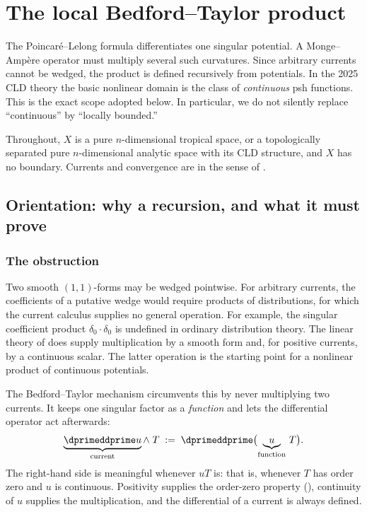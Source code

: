 \chapter{The local Bedford--Taylor product}
\label{chap:cld-bedford-taylor}

The Poincar\'e--Lelong formula differentiates one singular potential.  A
Monge--Amp\`ere operator must multiply several such curvatures.  Since
arbitrary currents cannot be wedged, the product is defined recursively from
potentials.  In the 2025 CLD theory the basic nonlinear domain is the class
of \emph{continuous} psh functions.  This is the exact scope adopted below.
In particular, we do not silently replace ``continuous'' by ``locally
bounded.''

Throughout, $X$ is a pure $n$-dimensional tropical space, or a
topologically separated pure $n$-dimensional analytic space with its CLD
structure, and $X$ has no boundary.  Currents and convergence are in the
sense of .

\section{Orientation: why a recursion, and what it must prove}
\label{sec:ch16-orientation}

\subsection{The obstruction}
\label{sec:ch16-obstruction}

Two smooth $(1,1)$-forms may be wedged pointwise.  For arbitrary
currents, the coefficients of a putative wedge would require products of
distributions, for which the current calculus supplies no general operation.
For example, the singular coefficient product $\delta_0\cdot\delta_0$ is
undefined in ordinary distribution theory.  The linear theory of
 does supply multiplication by a smooth form and,
for positive currents, by a continuous scalar.  The latter operation is the
starting point for a nonlinear product of continuous potentials.

The Bedford--Taylor mechanism circumvents this by never multiplying two
currents.  It keeps one singular factor as a \emph{function} and lets the
differential operator act afterwards:
\begin{equation}
\label{eq:ch16-recursion-schema}
 \underbrace{\dprimeddprime u}_{\text{current}}\wedge\;T
 \;:=\;
 \dprimeddprime\bigl(\underbrace{u}_{\text{function}}\,T\bigr).
\end{equation}
The right-hand side is meaningful whenever $uT$ is: that is, whenever $T$
has order zero and $u$ is continuous.  Positivity supplies the order-zero
property (), continuity of $u$
supplies the multiplication, and the differential of a current is always
defined.

